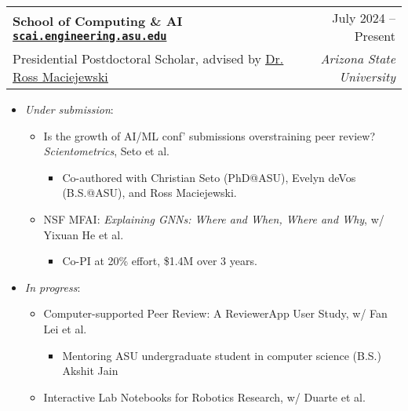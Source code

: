 \documentclass[letterpaper,11pt]{article}
\makeatletter
\newcommand{\resumeItem}[1]{
  \item\small{
    {#1 \vspace{-2pt}}
  }
}
\newcommand{\resumeSubheading}[4]{
  \vspace{-2pt}\item
    \begin{tabular*}{0.97\textwidth}[t]{l@{\extracolsep{\fill}}r}
      \textbf{#1} & #2 \\
      \small#3 & \textit{\small #4} \\
    \end{tabular*}\vspace{-7pt}
}
\newcommand{\resumeItemListStart}{\begin{itemize}}
\newcommand{\resumeItemListEnd}{\end{itemize}\vspace{-5pt}}
\makeatother
\begin{document}
\resumeSubheading
{School of Computing \& AI
  \href{https://scai.engineering.asu.edu/}
  {\texttt{{scai.engineering.asu.edu}}}
}{July 2024 -- Present}
{Presidential Postdoctoral Scholar, advised by \href{http://rmaciejewski.faculty.asu.edu/}{\underline{Dr. Ross Maciejewski}}}{Arizona State University}
\begin{itemize}
  \item \emph{Under submission}:
  \begin{itemize}
    \item Is the growth of AI/ML conf' submissions overstraining peer review? \emph{Scientometrics}, Seto et al.
    \begin{itemize}
      \item Co-authored with Christian Seto (PhD@ASU), Evelyn deVos (B.S.@ASU), and Ross Maciejewski.
    \end{itemize}
    \item NSF MFAI: \textit{Explaining GNNs: Where and When, Where and Why}, w/ Yixuan He et al.
    \begin{itemize}
      \item Co-PI at 20\% effort, \$1.4M over 3 years.
    \end{itemize}
  \end{itemize}
  \item \emph{In progress}:
  \begin{itemize}
    \item Computer-supported Peer Review: A ReviewerApp User Study, w/ Fan Lei et al.
    \begin{itemize}
      \item Mentoring ASU undergraduate student in computer science (B.S.) Akshit Jain 
    \end{itemize}
    \item Interactive Lab Notebooks for Robotics Research, w/ Duarte et al.

\end{itemize}
\end{itemize}
\end{document}
